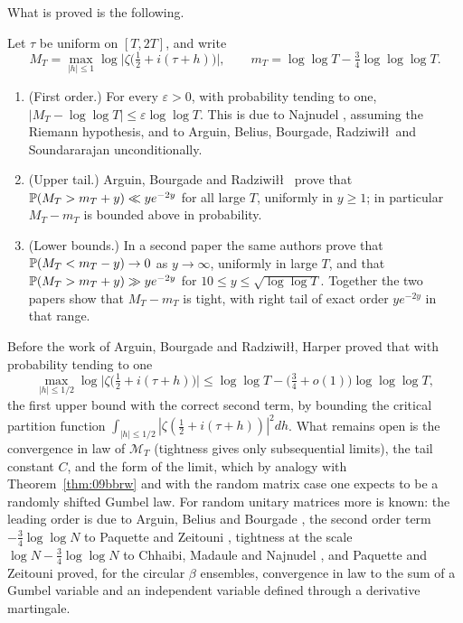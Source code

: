 What is proved is the following.

\begin{theorem}\label{thm:09bfhkproved}
Let $\tau$ be uniform on $[T,2T]$, and write
\[
M_T=\max_{|h|\le1}\log\bigl|\zeta\bigl(\tfrac12+i(\tau+h)\bigr)\bigr|,\qquad m_T=\log\log T-\tfrac34\log\log\log T .
\]
\begin{enumerate}
\item (First order.) For every $\varepsilon>0$, with probability tending to one, $|M_T-\log\log T|\le\varepsilon\log\log T$. This is due to Najnudel \cite{najnudel2018}, assuming the Riemann hypothesis, and to Arguin, Belius, Bourgade, Radziwi\l\l\ and Soundararajan \cite{abbrs2019} unconditionally.
\item (Upper tail.) Arguin, Bourgade and Radziwi\l\l\ \cite{abr2020} prove that $\mathbb{P}(M_T>m_T+y)\ll ye^{-2y}$ for all large $T$, uniformly in $y\ge1$; in particular $M_T-m_T$ is bounded above in probability.
\item (Lower bounds.) In a second paper \cite{abr2023} the same authors prove that $\mathbb{P}(M_T<m_T-y)\to0$ as $y\to\infty$, uniformly in large $T$, and that $\mathbb{P}(M_T>m_T+y)\gg ye^{-2y}$ for $10\le y\le\sqrt{\log\log T}$. Together the two papers show that $M_T-m_T$ is tight, with right tail of exact order $ye^{-2y}$ in that range.
\end{enumerate}
\end{theorem}

Before the work of Arguin, Bourgade and Radziwi\l\l, Harper \cite{harper2019} proved that with probability tending to one
\[
\max_{|h|\le1/2}\log\bigl|\zeta\bigl(\tfrac12+i(\tau+h)\bigr)\bigr|\le\log\log T-\bigl(\tfrac34+o(1)\bigr)\log\log\log T,
\]
the first upper bound with the correct second term, by bounding the critical partition function $\int_{|h|\le1/2}|\zeta(\frac12+i(\tau+h))|^2dh$. What remains open is the convergence in law of $\mathcal{M}_T$ (tightness gives only subsequential limits), the tail constant $C$, and the form of the limit, which by analogy with Theorem~\ref{thm:09bbrw} and with the random matrix case one expects to be a randomly shifted Gumbel law. For random unitary matrices more is known: the leading order is due to Arguin, Belius and Bourgade \cite{abb2017}, the second order term $-\frac34\log\log N$ to Paquette and Zeitouni \cite{paquettezeitouni2018}, tightness at the scale $\log N-\frac34\log\log N$ to Chhaibi, Madaule and Najnudel \cite{cmn2018}, and Paquette and Zeitouni \cite{paquettezeitouni2022} proved, for the circular $\beta$ ensembles, convergence in law to the sum of a Gumbel variable and an independent variable defined through a derivative martingale.

